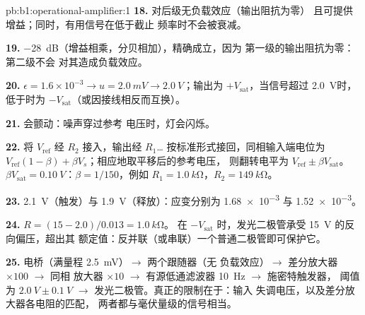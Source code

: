 \begin{solution}{pb:b1:operational-amplifier:1}
\textbf{18.} 对后级无负载效应（输出阻抗为零）
且可提供增益；同时，有用信号在低于截止
频率时不会被衰减。

\textbf{19.} \qty{-28}{dB}（增益相乘，分贝相加），精确成立，因为
第一级的输出阻抗为零：第二级不会
对其造成负载效应。

\textbf{20.} $\epsilon = 1.6\times10^{-3} \to u = \qty{2.0}{mV} \to
\qty{2.0}{V}$；输出为 $+V_{\mathrm{sat}}$，当信号超过
\qty{2.0}{V}时，低于时为 $-V_{\mathrm{sat}}$（或因接线相反而互换）。

\textbf{21.} 会颤动：噪声穿过参考
电压时，灯会闪烁。

\textbf{22.} 将 $V_{\mathrm{ref}}$ 经 $R_2$ 接入，输出经
$R_1$\dots{} 按标准形式接回，同相输入端电位为
$V_{\mathrm{ref}}(1 - \beta) + \beta V_s$；相应地取平移后的参考电压，
则翻转电平为 $V_{\mathrm{ref}} \pm \beta V_{\mathrm{sat}}$。
$\beta V_{\mathrm{sat}} = \qty{0.10}{V}$：$\beta = 1/150$，例如 $R_1 =
\qty{1.0}{k\ohm}$，$R_2 = \qty{149}{k\ohm}$。

\textbf{23.} \qty{2.1}{V}（触发）与 \qty{1.9}{V}（释放）：应变分别为
\num{1.68e-3} 与 \num{1.52e-3}。

\textbf{24.} $R = (15 - 2.0)/0.013 = \qty{1.0}{k\ohm}$。
在 $-V_{\mathrm{sat}}$ 时，发光二极管承受 \qty{15}{V} 的反向偏压，超出其
额定值：反并联（或串联）一个普通二极管即可保护它。

\textbf{25.} 电桥（满量程 \qty{2.5}{mV}）$\to$ 两个跟随器（无
负载效应）$\to$ 差分放大器 $\times100$ $\to$ 同相
放大器 $\times10$ $\to$ 有源低通滤波器 \qty{10}{Hz} $\to$ 施密特触发器，
阈值为 $\qty{2.0}{V} \pm \qty{0.1}{V}$ $\to$ 发光二极管。真正的限制在于：输入
失调电压，以及差分放大器各电阻的匹配，
两者都与毫伏量级的信号相当。
\end{solution}
